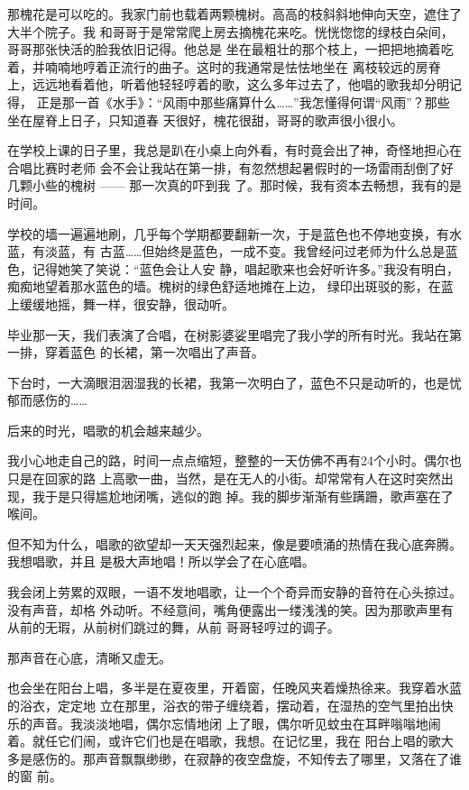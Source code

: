 		那槐花是可以吃的。我家门前也载着两颗槐树。高高的枝斜斜地伸向天空，遮住了大半个院子。我
	和哥哥于是常常爬上房去摘槐花来吃。恍恍惚惚的绿枝白朵间，哥哥那张快活的脸我依旧记得。他总是
	坐在最粗壮的那个枝上，一把把地摘着吃着，并喃喃地哼着正流行的曲子。这时的我通常是怯怯地坐在
	离枝较远的房脊上，远远地看着他，听着他轻轻哼着的歌，这么多年过去了，他唱的歌我却分明记得，
	正是那一首《水手》：“风雨中那些痛算什么……”我怎懂得何谓“风雨”？那些坐在屋脊上日子，只知道春
	天很好，槐花很甜，哥哥的歌声很小很小。

		在学校上课的日子里，我总是趴在小桌上向外看，有时竟会出了神，奇怪地担心在合唱比赛时老师
	会不会让我站在第一排，有忽然想起暑假时的一场雷雨刮倒了好几颗小些的槐树 —— 那一次真的吓到我
	了。那时候，我有资本去畅想，我有的是时间。

		学校的墙一遍遍地刷，几乎每个学期都要翻新一次，于是蓝色也不停地变换，有水蓝，有淡蓝，有
	古蓝……但始终是蓝色，一成不变。我曾经问过老师为什么总是蓝色，记得她笑了笑说：“蓝色会让人安
	静，唱起歌来也会好听许多。”我没有明白，痴痴地望着那水蓝色的墙。槐树的绿色舒适地摊在上边，
	绿印出斑驳的影，在蓝上缓缓地摇，舞一样，很安静，很动听。

		毕业那一天，我们表演了合唱，在树影婆娑里唱完了我小学的所有时光。我站在第一排，穿着蓝色
	的长裙，第一次唱出了声音。

		下台时，一大滴眼泪洇湿我的长裙，我第一次明白了，蓝色不只是动听的，也是忧郁而感伤的……

		后来的时光，唱歌的机会越来越少。

		我小心地走自己的路，时间一点点缩短，整整的一天仿佛不再有24个小时。偶尔也只是在回家的路
	上高歌一曲，当然，是在无人的小街。却常常有人在这时突然出现，我于是只得尴尬地闭嘴，逃似的跑
	掉。我的脚步渐渐有些蹒跚，歌声塞在了喉间。

		但不知为什么，唱歌的欲望却一天天强烈起来，像是要喷涌的热情在我心底奔腾。我想唱歌，并且
	是极大声地唱！所以学会了在心底唱。

		我会闭上劳累的双眼，一语不发地唱歌，让一个个奇异而安静的音符在心头掠过。没有声音，却格
	外动听。不经意间，嘴角便露出一缕浅浅的笑。因为那歌声里有从前的无瑕，从前树们跳过的舞，从前
	哥哥轻哼过的调子。

		那声音在心底，清晰又虚无。

		也会坐在阳台上唱，多半是在夏夜里，开着窗，任晚风夹着燥热徐来。我穿着水蓝的浴衣，定定地
	立在那里，浴衣的带子缠绕着，摆动着，在湿热的空气里拍出快乐的声音。我淡淡地唱，偶尔忘情地闭
	上了眼，偶尔听见蚊虫在耳畔嗡嗡地闹着。就任它们闹，或许它们也是在唱歌，我想。在记忆里，我在
	阳台上唱的歌大多是感伤的。那声音飘飘缈缈，在寂静的夜空盘旋，不知传去了哪里，又落在了谁的窗
	前。

